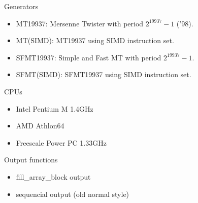 \documentclass[a4j,12pt,landscape]{jarticle}
\begin{document}
\begin{description}
  \item Generators
    \begin{itemize}
    \item MT19937: Mersenne Twister with period $2^{19937}-1$ ('98).
    \item MT(SIMD): MT19937 using SIMD instruction set.
    \item SFMT19937: Simple and Fast MT with period $2^{19937}-1$.
    \item SFMT(SIMD): SFMT19937 using SIMD instruction set.
    \end{itemize}
  \item CPUs
    \begin{itemize}
    \item Intel Pentium M 1.4GHz
    \item AMD Athlon64 
    \item Freescale Power PC 1.33GHz
    \end{itemize}
  \item Output functions
    \begin{itemize}
    \item fill\_array\_block output
    \item sequencial output (old normal style)
    \end{itemize}
  \end{description}
\end{document}
